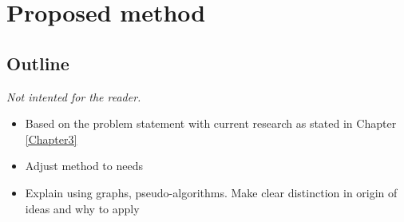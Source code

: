 
\chapter{Proposed method}

\label{Chapter4} %


\section{Outline}
\emph{Not intented for the reader.}
\begin{itemize}
  \item Based on the problem statement with current research as stated in Chapter \ref{Chapter3}
  \item Adjust method to needs
  \item Explain using graphs, pseudo-algorithms. Make clear distinction in origin of ideas and why to apply
\end{itemize}





